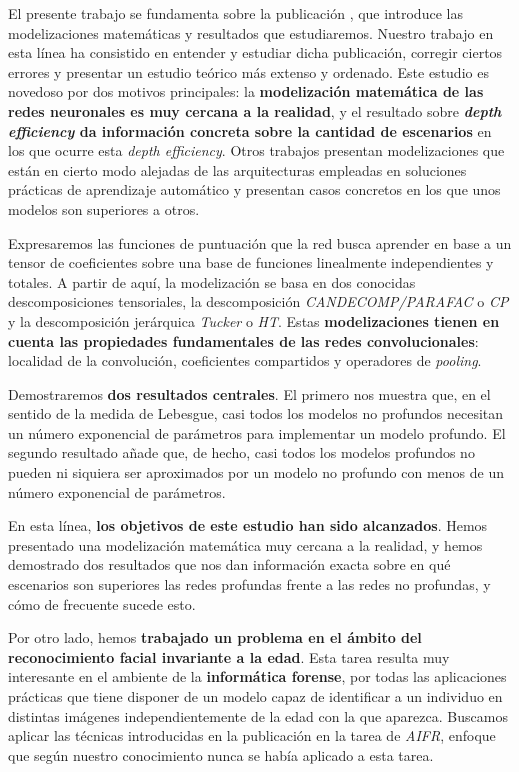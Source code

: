 El presente trabajo se fundamenta sobre la publicación \cite{matematicas:principal}, que introduce las modelizaciones matemáticas y resultados que estudiaremos. Nuestro trabajo en esta línea ha consistido en entender y estudiar dicha publicación, corregir ciertos errores y presentar un estudio teórico más extenso y ordenado. Este estudio es novedoso por dos motivos principales: la \textbf{modelización matemática de las redes neuronales es muy cercana a la realidad}, y el resultado sobre \textbf{\textit{depth efficiency} da información concreta sobre la cantidad de escenarios} en los que ocurre esta \textit{depth efficiency}. Otros trabajos presentan modelizaciones que están en cierto modo alejadas de las arquitecturas empleadas en soluciones prácticas de aprendizaje automático y presentan casos concretos en los que unos modelos son superiores a otros.

Expresaremos las funciones de puntuación que la red busca aprender en base a un tensor de coeficientes sobre una base de funciones linealmente independientes y totales. A partir de aquí, la modelización se basa en dos conocidas descomposiciones tensoriales, la descomposición \textit{CANDECOMP/PARAFAC} o \textit{CP} y la descomposición jerárquica \textit{Tucker} o \textit{HT}. Estas \textbf{modelizaciones tienen en cuenta las propiedades fundamentales de las redes convolucionales}: localidad de la convolución, coeficientes compartidos y operadores de \textit{pooling}.

Demostraremos \textbf{dos resultados centrales}. El primero nos muestra que, en el sentido de la medida de Lebesgue, casi todos los modelos no profundos necesitan un número exponencial de parámetros para implementar un modelo profundo. El segundo resultado añade que, de hecho, casi todos los modelos profundos no pueden ni siquiera ser aproximados por un modelo no profundo con menos de un número exponencial de parámetros.

En esta línea, \textbf{los objetivos de este estudio han sido alcanzados}. Hemos presentado una modelización matemática muy cercana a la realidad, y hemos demostrado dos resultados que nos dan información exacta sobre en qué escenarios son superiores las redes profundas frente a las redes no profundas, y cómo de frecuente sucede esto.

Por otro lado, hemos \textbf{trabajado un problema en el ámbito del reconocimiento facial invariante a la edad}. Esta tarea resulta muy interesante en el ambiente de la \textbf{informática forense}, por todas las aplicaciones prácticas que tiene disponer de un modelo capaz de identificar a un individuo en distintas imágenes independientemente de la edad con la que aparezca. Buscamos aplicar las técnicas introducidas en la publicación \cite{informatica:principal} en la tarea de \textit{AIFR}, enfoque que según nuestro conocimiento nunca se había aplicado a esta tarea.

